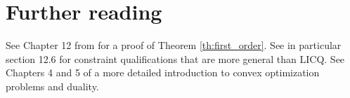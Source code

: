 \documentclass[11pt,nocut]{article}
\begin{document}
\section*{Further reading}

See Chapter 12 from \cite{nocedal2006numerical} for a proof of Theorem \ref{th:first_order}. See in particular section 12.6 for constraint qualifications that are more general than LICQ.
See Chapters 4 and 5 of \cite{boyd2004convex} a more detailed introduction to convex optimization problems and duality.

\vspace{1cm}
\centerline{}




\end{document}
